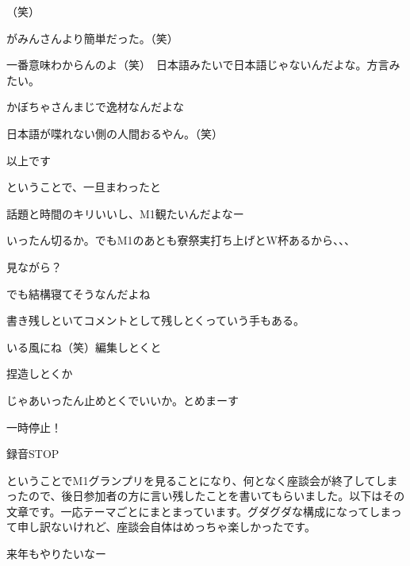\begin{multicols}{2}
  （笑）

  がみんさんより簡単だった。（笑）

  一番意味わからんのよ（笑）　日本語みたいで日本語じゃないんだよな。方言みたい。

  かぼちゃさんまじで逸材なんだよな

  日本語が喋れない側の人間おるやん。（笑）

  以上です

  ということで、一旦まわったと

  話題と時間のキリいいし、M1観たいんだよなー

  いったん切るか。でもM1のあとも寮祭実打ち上げとW杯あるから、、、

  見ながら？

  でも結構寝てそうなんだよね

  書き残しといてコメントとして残しとくっていう手もある。

  いる風にね（笑）編集しとくと

  捏造しとくか

  じゃあいったん止めとくでいいか。とめまーす

  一時停止！

\end{multicols}

録音STOP



ということでM1グランプリを見ることになり、何となく座談会が終了してしまったので、後日参加者の方に言い残したことを書いてもらいました。以下はその文章です。一応テーマごとにまとまっています。グダグダな構成になってしまって申し訳ないけれど、座談会自体はめっちゃ楽しかったです。

来年もやりたいなー


